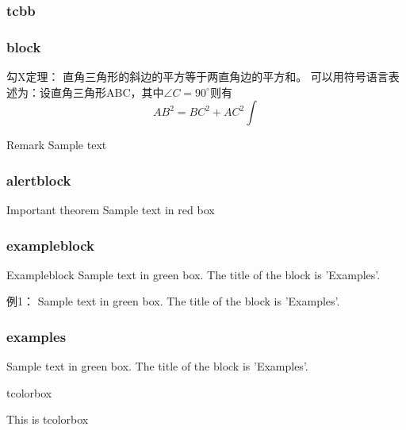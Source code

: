 \begin{frame}
  \frametitle{tcbb}
  \centering
\end{frame}

\begin{frame}\frametitle{block}
	\begin{block}{勾X定理：}
		直角三角形的斜边的平方等于两直角边的平方和。
		可以用符号语言表述为：设直角三角形ABC，其中$\angle C=90^\circ $则有
		\begin{equation}
			AB^2=BC^2+AC^2 \int
		\end{equation}
	\end{block}
	\begin{block}{Remark}
		Sample text
	\end{block}
\end{frame}

\begin{frame}
    \frametitle{alertblock}
	\begin{alertblock}{Important theorem}
		Sample text in red box
	\end{alertblock}
\end{frame}

\begin{frame}
    \frametitle{exampleblock}
	\begin{exampleblock} {Exampleblock}
		Sample text in green box. The title of the block is 'Examples'.
	\end{exampleblock}
    \begin{exampleblock} {例1：}
		Sample text in green box. The title of the block is 'Examples'.
	\end{exampleblock}
\end{frame}

\begin{frame}
    \frametitle{examples}
	\begin{examples}
		Sample text in green box. The title of the block is 'Examples'.
	\end{examples}
\end{frame}

\begin{frame}{tcolorbox}  
  \begin{tcolorbox}[title=5.tcolorbox,colframe=red!75!black]
    This is tcolorbox
  \end{tcolorbox}
\end{frame}

